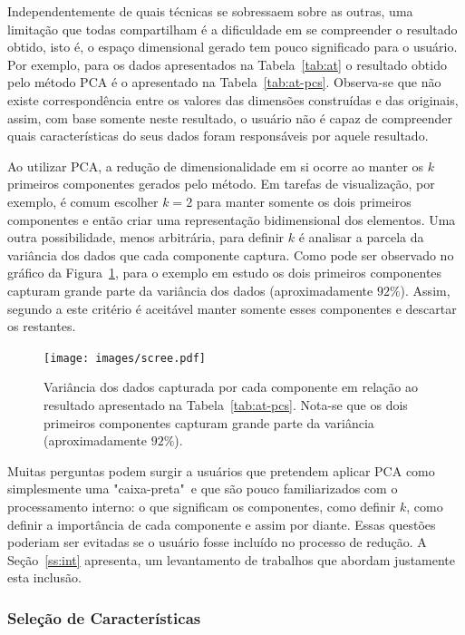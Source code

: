 Independentemente de quais técnicas se sobressaem sobre as
outras, uma limitação que todas compartilham é a dificuldade
em se compreender o resultado obtido, isto é, o espaço
dimensional gerado tem pouco significado para o usuário. Por
exemplo, para os dados apresentados na Tabela~\ref{tab:at} o
resultado obtido pelo método PCA é o apresentado na
Tabela~\ref{tab:at-pcs}. Observa-se que não existe
correspondência entre os valores das dimensões construídas e
das originais, assim, com base somente neste resultado, o
usuário não é capaz de compreender quais características do
seus dados foram responsáveis por aquele resultado.

Ao utilizar PCA, a redução de dimensionalidade em si ocorre
ao  manter os $k$ primeiros componentes gerados pelo método.
Em tarefas de visualização, por exemplo, é comum escolher
$k=2$ para manter somente os dois primeiros componentes e
então criar uma representação bidimensional dos elementos.
Uma outra possibilidade, menos arbitrária, para definir $k$
é analisar a parcela da variância dos dados que cada
componente captura. Como pode ser observado no gráfico da
Figura~\ref{fig:scree}, para o exemplo em estudo os dois
primeiros componentes capturam grande parte da variância dos
dados (aproximadamente $92\%$). Assim, segundo a este
critério é aceitável manter somente esses componentes e
descartar os restantes. 

\begin{figure}[h!]
    \centering
    \texttt{[image: images/scree.pdf]}
    \caption[Variância capturada pelos PCs]{Variância dos
        dados capturada por cada componente em relação ao
        resultado apresentado na Tabela~\ref{tab:at-pcs}.
        Nota-se que os dois primeiros componentes capturam
        grande parte da variância (aproximadamente $92\%$).}
    \label{fig:scree}
\end{figure}

Muitas perguntas podem surgir a usuários que pretendem
aplicar PCA como simplesmente uma "caixa-preta"~e que são
pouco familiarizados com o processamento interno: o que
significam os componentes, como definir $k$, como definir a
importância de cada componente e assim por diante. Essas
questões poderiam ser evitadas se o usuário fosse incluído
no processo de redução. A Seção~\ref{ss:int} apresenta, um
levantamento de trabalhos que abordam justamente esta
inclusão.

\subsubsection{Seleção de Características} 

